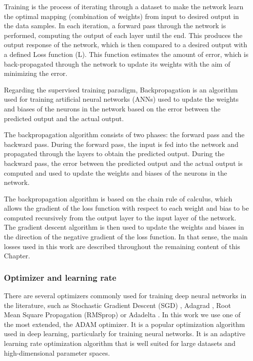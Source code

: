 Training is the process of iterating through a dataset to make the network learn the optimal mapping (combination of weights) from input to desired output in the data samples. In each iteration, a forward pass through the network is performed, computing the output of each layer until the end. This produces the output response of the network, which is then compared to a desired output with a defined Loss function (L). This function estimates the amount of error, which is back-propagated through the network to update its weights with the aim of minimizing the error. 

Regarding the supervised training paradigm, Backpropagation is an algorithm used for training artificial neural networks (ANNs) used to update the weights and biases of the neurons in the network based on the error between the predicted output and the actual output.

The backpropagation algorithm consists of two phases: the forward pass and the backward pass. During the forward pass, the input is fed into the network and propagated through the layers to obtain the predicted output. During the backward pass, the error between the predicted output and the actual output is computed and used to update the weights and biases of the neurons in the network.

The backpropagation algorithm is based on the chain rule of calculus, which allows the gradient of the loss function with respect to each weight and bias to be computed recursively from the output layer to the input layer of the network. The gradient descent algorithm is then used to update the weights and biases in the direction of the negative gradient of the loss function. In that sense, the main losses used in this work are described throughout the remaining content of this Chapter.

\subsubsection{Optimizer and learning rate}
\label{subsubsec:3_optimizer_and_lr}

There are several optimizers commonly used for training deep neural networks in the literature, such as Stochastic Gradient Descent (SGD) \cite{robbins1951stochastic}, Adagrad \cite{duchi2011adaptive}, Root Mean Square Propagation (RMSprop) \cite{zou2019sufficient} or Adadelta \cite{zeiler2012adadelta}. In this work we use one of the most extended, the ADAM \cite{kingma2014adam} optimizer. It is a popular optimization algorithm used in deep learning, particularly for training neural networks. It is an adaptive learning rate optimization algorithm that is well suited for large datasets and high-dimensional parameter spaces.

